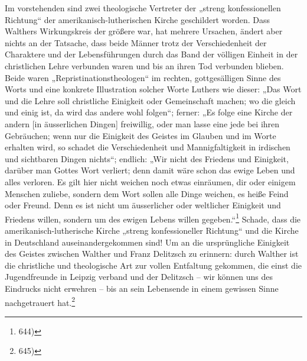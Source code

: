 Im vorstehenden sind zwei theologische Vertreter der „streng konfessionellen Richtung“ der amerikanisch-lutherischen Kirche geschildert worden. Dass Walthers Wirkungskreis der größere war, hat mehrere Ursachen, ändert aber nichts an der Tatsache, dass beide Männer trotz der Verschiedenheit der Charaktere und der Lebensführungen durch das Band der völligen Einheit in der christlichen Lehre verbunden waren und bis an ihren Tod verbunden blieben. Beide waren „Repristinationstheologen“ im rechten, gottgesälligen Sinne des Worts und eine konkrete Illustration solcher Worte Luthers wie dieser: „Das Wort und die Lehre soll christliche Einigkeit oder Gemeinschaft machen; wo die gleich und einig ist, da wird das andere wohl folgen“; ferner: „Es folge eine Kirche der andern [in äusserlichen Dingen] freiwillig, oder man lasse eine jede bei ihren Gebräuchen; wenn nur die Einigkeit des Geistes im Glauben und im Worte erhalten wird, so schadet die Verschiedenheit und Mannigfaltigkeit in irdischen und sichtbaren Dingen nichts“; endlich: „Wir nicht des Friedens und Einigkeit, darüber man Gottes Wort verliert; denn damit wäre schon das ewige Leben und alles verloren. Es gilt hier nicht weichen noch etwas einräumen, dir oder einigem Menschen zuliebe, sondern dem Wort sollen alle Dinge weichen, es heiße Feind oder Freund. Denn es ist nicht um äusserlicher oder weltlicher Einigkeit und Friedens willen, sondern um des ewigen Lebens willen gegeben.“\footnote{644)} Schade, dass die amerikanisch-lutherische Kirche „streng konfessioneller Richtung“ und die Kirche in Deutschland auseinandergekommen sind! Um an die ursprüngliche Einigkeit des Geistes zwischen Walther und Franz Delitzsch zu erinnern: durch Walther ist die christliche und theologische Art zur vollen Entfaltung gekommen, die einst die Jugendfreunde in Leipzig verband und der Delitzsch – wir können uns des Eindrucks nicht erwehren – bis an sein Lebensende in einem gewissen Sinne nachgetrauert hat.\footnote{645)}

